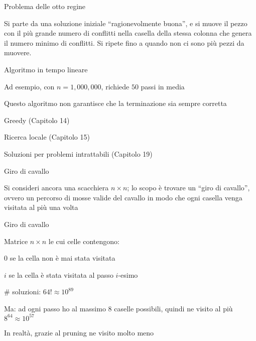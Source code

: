 \begin{frame}{Problema delle otto regine}

\vspace{-9pt}
\begin{myboxtitle}
Si parte da una soluzione iniziale “ragionevolmente buona”, e si muove
il pezzo con il più grande numero di conflitti nella casella della stessa 
colonna che genera il numero minimo di conflitti. Si ripete fino a quando non ci
sono più pezzi da muovere.
\end{myboxtitle}
	
\BIL
\item Algoritmo in tempo lineare
\item Ad esempio, con $n=1,000,000$, richiede $50$ passi in media
\item Questo algoritmo non garantisce che la terminazione sia sempre corretta
 \BI
 \item Greedy (Capitolo 14)
 \item Ricerca locale (Capitolo 15)
 \item Soluzioni per problemi intrattabili (Capitolo 19)
 \EI	
\EIL

\end{frame}

\begin{frame}{Giro di cavallo}

\vspace{-9pt}
\begin{myboxtitle}[Problema]
 Si consideri ancora una scacchiera $n \times n$; lo scopo è trovare un “giro di
cavallo”, ovvero un percorso di mosse valide del cavallo in modo che ogni
casella venga visitata al più una volta
\end{myboxtitle}

\end{frame}

\begin{frame}{Giro di cavallo}

\vspace{-9pt}
\begin{myboxtitle}[Soluzione]

\BIL
\item  Matrice $n \times n$ le cui celle contengono: 
	\BI
  \item $0$	\qquad	se la cella non è mai stata visitata
  \item $i$	\qquad		se la cella è stata visitata al passo $i$-esimo
	\EI
\item \# soluzioni: $64! \approx 10^{89}$
\item Ma: ad ogni passo ho al massimo $8$ caselle possibili, quindi ne visito al più $8^{64} \approx 10^{57}$
\item In realtà, grazie al pruning ne visito molto meno	
\EIL
\end{myboxtitle}
\end{frame}

